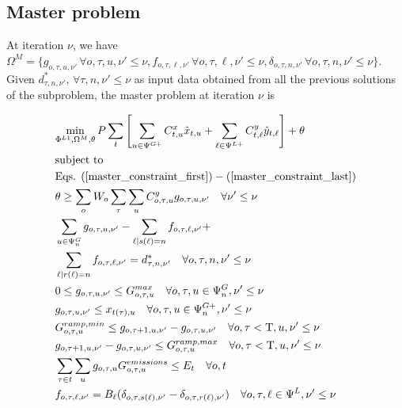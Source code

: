 \documentclass[final]{IEEEtran}
\newcommand{\Tau}{\mathrm{T}}
\begin{document}
\subsection{Master problem}

At iteration $\nu$, we have $\Omega^{M} = \{ g_{o, \tau, u, \nu'} \, \forall o, \tau, u, \nu' \leq \nu, f_{o, \tau, \ell, \nu'} \, \forall o, \tau, \ell, \nu' \leq \nu, \delta_{o, \tau, n, \nu'} \, \forall o, \tau, n, \nu' \leq \nu \}$. Given $d_{\tau, n, \nu'}^*, \, \forall \tau, n, \nu' \leq \nu$ as input data obtained from all the previous solutions of the subproblem, the master problem at iteration $\nu$ is

\begin{align}
&\label{master_obj} \underset{\Phi^{L1}, \Omega^{M}, \theta}{\text{min}} \, P \sum\limits_{t} \left[ \sum\limits_{u \in \Psi^{G+}} C^x_{t, u} \hat{x}_{t, u} + \sum\limits_{\ell \in \Psi^{L+}} C^y_{t, \ell} \hat{y}_{t, \ell} \right] + \theta \\
&\text{subject to} \nonumber \\
&\text{Eqs. } (\ref{master_constraint_first}) - (\ref{master_constraint_last}) \\
&\theta \geq \sum\limits_o W_o \sum\limits_{\tau} \sum\limits_{u} C_{o, \tau, u}^g g_{o, \tau, u, \nu'} \quad \forall \nu' \leq \nu \\
&\sum\limits_{u \in \Psi^G_{n}} g_{o, \tau, u, \nu'} - \sum\limits_{\ell | s(\ell) = n} f_{o, \tau, \ell, \nu'} + \\
&\sum\limits_{\ell | r(\ell) = n} f_{o, \tau, \ell, \nu'} = d_{\tau, n, \nu'}^* \quad \forall o, \tau, n, \nu' \leq \nu \\
&0 \leq g_{o, \tau, u, \nu'} \leq G_{o, \tau, u}^{max} \quad \forall o, \tau, u \in \Psi_n^G, \nu' \leq \nu \\
&g_{o, \tau, u, \nu'} \leq x_{t(\tau), u} \quad \forall o, \tau, u \in \Psi_n^{G+}, \nu' \leq \nu \\
&G^{ramp,min}_{o, \tau, u} \leq g_{o, \tau + 1, u, \nu'} - g_{o, \tau, u, \nu'} \quad \forall o, \tau < \Tau, u, \nu' \leq \nu \\
&g_{o, \tau + 1, u, \nu'} - g_{o, \tau, u, \nu'} \leq G^{ramp,max}_{o, \tau, u} \quad \forall o, \tau < \Tau, u, \nu' \leq \nu \\
&\sum\limits_{\tau \in t} \sum\limits_{u} g_{o, \tau, u} G^{emissions}_{o, \tau, u} \leq E_{t} \quad \forall o, t \\
&f_{o, \tau, \ell, \nu'} = B_\ell (\delta_{o, \tau, s(\ell), \nu'} - \delta_{o, \tau, r(\ell), \nu'}) \quad \forall o, \tau, \ell \in \Psi^L, \nu' \leq \nu \\

\end{align}
\end{document}

